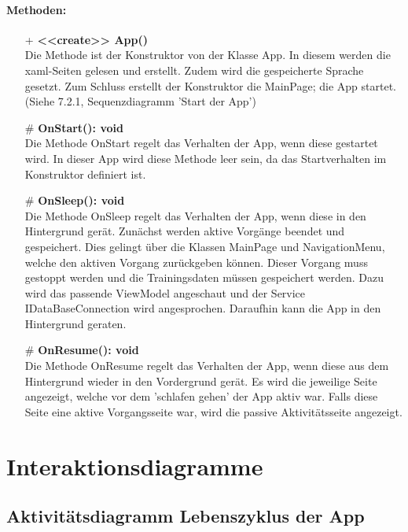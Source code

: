 \documentclass[a4paper,12pt]{article}
\begin{document}
	\paragraph{Methoden:}
	\begin{itemize}
		\item[+] \textbf{<<create>> App()}\\Die Methode ist der Konstruktor von der Klasse App. In diesem werden die xaml-Seiten gelesen und erstellt. Zudem wird die gespeicherte Sprache gesetzt. Zum Schluss erstellt der Konstruktor die MainPage; die App startet. (Siehe 7.2.1, Sequenzdiagramm 'Start der App')
		\item[\#] \textbf{OnStart(): void}\\Die Methode OnStart regelt das Verhalten der App, wenn diese gestartet wird. In dieser App wird diese Methode leer sein, da das Startverhalten im Konstruktor definiert ist.
		\item[\#] \textbf{OnSleep(): void}\\Die Methode OnSleep regelt das Verhalten der App, wenn diese in den Hintergrund gerät. Zunächst werden aktive Vorgänge beendet und gespeichert. Dies gelingt über die Klassen MainPage und NavigationMenu, welche den aktiven Vorgang zurückgeben können. Dieser Vorgang muss gestoppt werden und die Trainingsdaten müssen gespeichert werden. Dazu wird das passende ViewModel angeschaut und der Service IDataBaseConnection wird angesprochen.
		Daraufhin kann die App in den Hintergrund geraten.
		\item[\#] \textbf{OnResume(): void}\\Die Methode OnResume regelt das Verhalten der App, wenn diese aus dem Hintergrund wieder in den Vordergrund gerät. Es wird die jeweilige Seite angezeigt, welche vor dem 'schlafen gehen' der App aktiv war. Falls diese Seite eine aktive Vorgangsseite war, wird die passive Aktivitätsseite angezeigt.
	\end{itemize}
	
\newpage
\section{Interaktionsdiagramme}
\subsection{Aktivitätsdiagramm Lebenszyklus der App}
\end{document}
